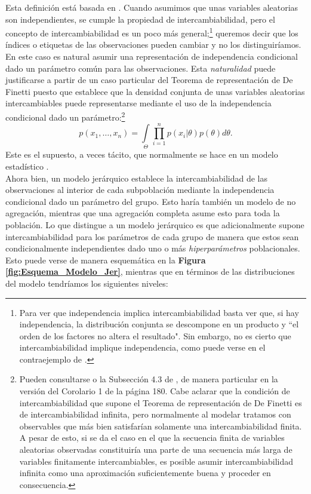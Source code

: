 Esta definición está basada en \textcite[169-171,Definiciones 4.2 y 4.3]{BernardoSmith00}. Cuando asumimos que unas variables aleatorias son independientes, se cumple la propiedad de intercambiabilidad, pero el concepto de intercambiabilidad es un poco más general;\footnote{Para ver que independencia implica intercambiabilidad basta ver que, si hay independencia, la distribución conjunta se descompone en un producto y ``el orden de los factores no altera el resultado". Sin embargo, no es cierto que intercambiabilidad implique independencia, como puede verse en el contraejemplo de \textcite[8]{GP98}.} queremos decir que los índices o etiquetas de las observaciones pueden cambiar y no los distinguiríamos. En este caso es natural asumir una representación de independencia condicional dado un parámetro común para las observaciones. Esta \textit{naturalidad} puede justificarse a partir de un caso particular del Teorema de representación de De Finetti puesto que establece que la densidad conjunta de unas variables aleatorias intercambiables puede representarse mediante el uso de la independencia condicional dado un parámetro:\footnote{Pueden consultarse \textcite[9-12]{GP98} o la Subsección 4.3 de \textcite{BernardoSmith00}, de manera particular en la versión del Corolario 1 de la página 180. Cabe aclarar que la condición de intercambiabilidad que supone el Teorema de representación de De Finetti es de intercambiabilidad infinita, pero normalmente al modelar tratamos con observables que más bien satisfarían solamente una intercambiabilidad finita. A pesar de esto, si se da el caso en el que la secuencia finita de variables aleatorias observadas constituiría una parte de una secuencia más larga de variables finitamente intercambiables, es posible asumir intercambiabilidad infinita como una aproximación suficientemente buena y proceder en consecuencia\parencite[226-227]{BernardoSmith00}.}
\begin{equation} \label{eq:Repr_DeFinetti}
p(x_1,\dots,x_n) = \int\limits_\Theta \prod\limits_{i=1}^n p(x_i|\theta)p(\theta)d\theta.
\end{equation}
Este es el supuesto, a veces tácito, que normalmente se hace en un modelo estadístico \parencite[5]{Gelman13}.\\

Ahora bien, un modelo jerárquico establece la intercambiabilidad de las observaciones al interior de cada subpoblación mediante la independencia condicional dado un parámetro del grupo. Esto haría también un modelo de no agregación, mientras que una agregación completa asume esto para toda la población. Lo que distingue a un modelo jerárquico es que adicionalmente supone intercambiabilidad para los parámetros de cada grupo de manera que estos sean condicionalmente independientes dado uno o más \textit{hiperparámetros} poblacionales. Esto puede verse de manera esquemática en la \textbf{Figura \ref{fig:Esquema_Modelo_Jer}}, mientras que en términos de las distribuciones del modelo tendríamos los siguientes niveles: 

